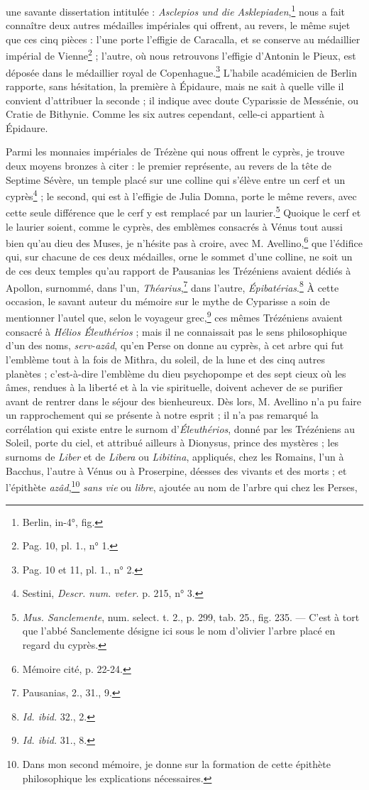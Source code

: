\documentclass{article}
\begin{document}
une savante dissertation intitulée : \emph{Asclepios und die Asklepiaden},\footnote{Berlin, in-4°, fig.} nous a fait connaître deux autres médailles impériales qui offrent, au revers, le même sujet que ces cinq pièces : l'une porte l'effigie de Caracalla, et se conserve au médaillier impérial de Vienne\footnote{Pag. 10, pl. 1., n° 1.} ; l'autre, où nous retrouvons l'effigie d'Antonin le Pieux, est déposée dans le médaillier royal de Copenhague.\footnote{Pag. 10 et 11, pl. 1., n° 2.} L'habile académicien de Berlin rapporte, sans hésitation, la première à Épidaure, mais ne sait à quelle ville il convient d'attribuer la seconde ; il indique avec doute Cyparissie de Messénie, ou Cratie de Bithynie. Comme les six autres cependant, celle-ci appartient à Épidaure.

Parmi les monnaies impériales de Trézène qui nous offrent le cyprès, je trouve deux moyens bronzes à citer : le premier représente, au revers de la tête de Septime Sévère, un temple placé sur une colline qui s'élève entre un cerf et un cyprès\footnote{Sestini, \emph{Descr. num. veter.} p. 215, n° 3.} ; le second, qui est à l'effigie de Julia Domna, porte le même revers, avec cette seule différence que le cerf y est remplacé par un laurier.\footnote{\emph{Mus. Sanclemente}, num. select. t. 2., p. 299, tab. 25., fig. 235. --- C'est à tort que l'abbé Sanclemente désigne ici sous le nom d'olivier l'arbre placé en regard du cyprès.} Quoique le cerf et le laurier soient, comme le cyprès, des emblèmes consacrés à Vénus tout aussi bien qu'au dieu des Muses, je n'hésite pas à croire, avec M. Avellino,\footnote{Mémoire cité, p. 22-24.} que l'édifice qui, sur chacune de ces deux médailles, orne le sommet d'une colline, ne soit un de ces deux temples qu'au rapport de Pausanias les Trézéniens avaient dédiés à Apollon, surnommé, dans l'un, \emph{Théarius},\footnote{Pausanias, 2., 31., 9.} dans l'autre, \emph{Épibatérias}.\footnote{\emph{Id. ibid.} 32., 2.} À cette occasion, le savant auteur du mémoire sur le mythe de Cyparisse a soin de mentionner l'autel que, selon le voyageur grec,\footnote{\emph{Id. ibid.} 31., 8.} ces mêmes Trézéniens avaient consacré à \emph{Hélios Éleuthérios} ; mais il ne connaissait pas le sens philosophique d'un des noms, \emph{serv-azâd}, qu'en Perse on donne au cyprès, à cet arbre qui fut l'emblème tout à la fois de Mithra, du soleil, de la lune et des cinq autres planètes ; c'est-à-dire l'emblème du dieu psychopompe et des sept cieux où les âmes, rendues à la liberté et à la vie spirituelle, doivent achever de se purifier avant de rentrer dans le séjour des bienheureux. Dès lors, M. Avellino n'a pu faire un rapprochement qui se présente à notre esprit ; il n'a pas remarqué la corrélation qui existe entre le surnom d'\emph{Éleuthérios}, donné par les Trézéniens au Soleil, porte du ciel, et attribué ailleurs à Dionysus, prince des mystères ; les surnoms de \emph{Liber} et de \emph{Libera} ou \emph{Libitina}, appliqués, chez les Romains, l'un à Bacchus, l'autre à Vénus ou à Proserpine, déesses des vivants et des morts ; et l'épithète \emph{azâd},\footnote{Dans mon second mémoire, je donne sur la formation de cette épithète philosophique les explications nécessaires.} \emph{sans vie} ou \emph{libre}, ajoutée au nom de l'arbre qui chez les Perses, 
\end{document}
